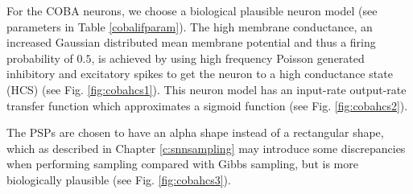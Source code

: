For the COBA neurons, we choose a biological plausible neuron model (see parameters in Table \ref{cobalifparam}). 
The high membrane conductance, an increased Gaussian distributed mean membrane potential and thus a firing probability of $0.5$, is achieved by using high frequency Poisson generated inhibitory and excitatory spikes to get the neuron to a high conductance state (HCS) (see Fig. \ref{fig:cobahcs1}). 
This neuron model has an input-rate output-rate transfer function which approximates a sigmoid function (see Fig. \ref{fig:cobahcs2}).

The PSPs are chosen to have an alpha shape instead of a rectangular shape, which as described in Chapter \ref{c:snnsampling} may introduce some discrepancies when performing sampling compared with Gibbs sampling, but is more biologically plausible (see Fig. \ref{fig:cobahcs3}).


